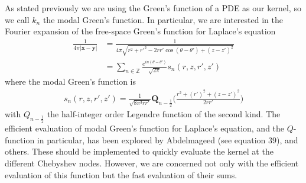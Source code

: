 \documentclass[11pt, oneside]{article}   	%
\begin{document}

As stated previously we are using the Green's function of a PDE as our kernel, so we call $k_n$ the modal Green's function. In particular, we are interested in the Fourier expansion of the free-space Green's function for Laplace's equation
\begin{align}
\frac{1}{4\pi |\mathbf{x}-\mathbf{y}|} &=\frac{1}{4\pi\sqrt{r^2+r'^2-2rr'\cos{(\theta-\theta')}+(z-z')^2}}\\
&= \sum_{n\in\mathbb{Z}} \frac{e^{in(\theta-\theta')}}{\sqrt{2\pi}} s_n(r,z,r',z')
\end{align}
where the modal Green's function is
\begin{align}
s_n(r,z,r',z')=\frac{1}{\sqrt{8\pi^3 rr'}}\mathbf{Q}_{n-\frac{1}{2}}\bigg(\frac{r^2+(r')^2+(z-z')^2}{2rr'}\bigg)
\end{align}
with $Q_{n-\frac{1}{2}}$ the half-integer order Legendre function of the second kind. The efficient evaluation of modal Green's function for Laplace's equation, and the $Q$-function in particular, has been explored by Abdelmageed (see equation $39$), and others. These should be implemented to quickly evaluate the kernel at the different Chebyshev nodes. However, we are concerned not only with the efficient evaluation of this function but the fast evaluation of their sums.
\end{document}
